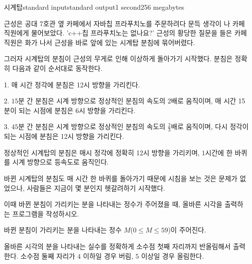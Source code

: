 \begin{problem}{시계탑}{standard input}{standard output}{1 second}{256 megabytes}

근성은 공대 7호관 옆 카페에서 자바칩 프라푸치노를 주문하려다 문득 생각이 나 카페 직원에게 물어보았다. 'c++칩 프라푸치노는 없나요?' 
근성의 황당한 질문을 들은 카페 직원은 화가 나서 근성을 바로 앞에 있는 시계탑 분침에 묶어버렸다. 

그러자 시계탑의 분침이 근성의 무게로 인해 이상하게 돌아가기 시작했다. 분침은 정확히 다음과 같이 순서대로 동작한다. 

1. 매 시간 정각에 분침은 12시 방향을 가리킨다. 

2. $15$분 간 분침은 시계 방향으로 정상적인 분침의 속도의 $2$배로 움직이며, 매 시간 15분이 되는 시점에 분침은 6시 방향을 가리킨다. 

3. $45$분 간 분침은 시계 방향으로 정상적인 분침의 속도의 $\frac{2}{3}$배로 움직이며, 다시 정각이 되는 시점에 분침은 12시 방향을 가리킨다.

정상적인 시계탑의 분침은 매시 정각에 정확히 12시 방향을 가리키며, $1$시간에 한 바퀴를 시계 방향으로 등속도로 움직인다. 

바뀐 시계탑의 분침도 매 시간 한 바퀴를 돌아가기 때문에 시침을 보는 것은 문제가 없었으나, 사람들은 지금이 몇 분인지 헷갈려하기 시작했다. 

이때 바뀐 분침이 가리키는 분을 나타내는 정수가 주어졌을 때, 올바른 시각을 출력하는 프로그램을 작성하시오. 

\InputFile
바뀐 분침이 가리키는 분을 나타내는 정수 $M$($0\leq M\leq 59$)이 주어진다. 

\OutputFile
올바른 시각의 분을 나타내는 실수를 정확하게 소수점 첫째 자리까지 반올림해서 출력한다. 소수점 둘째 자리가 $4$ 이하일 경우 버림, $5$ 이상일 경우 올림한다. 

\Examples

\begin{example}
%
%
\end{example}

\end{problem}

